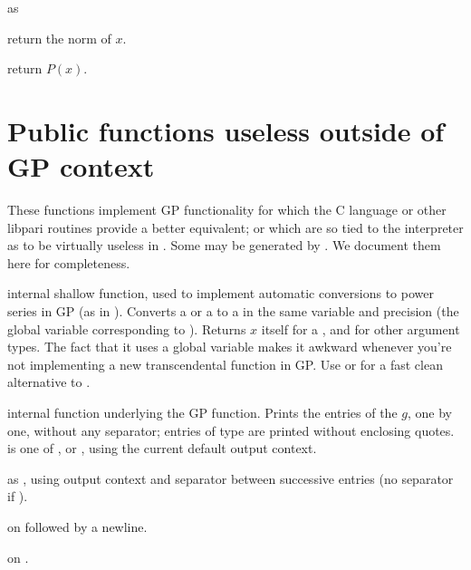 as 

 return the
norm of $x$.

return $P(x)$.

\section{Public functions useless outside of GP context}

These functions implement GP functionality for which the C language or
other libpari routines provide a better equivalent; or which are so tied
to the  interpreter as to be virtually useless in . Some
may be generated by . We document them here for completeness.


 internal shallow function, used to implement
automatic conversions to power series in GP (as in ).
Converts a  or a  to a  in the same variable and
precision  (the global variable corresponding to
). Returns $x$ itself for a , and 
for other argument types. The fact that it uses a global variable makes it
awkward whenever you're not implementing a new transcendental function in GP.
Use  or  for a fast clean alternative to
.


 internal function underlying the
 GP function. Prints the entries of the  $g$, one by one,
without any separator; entries of type  are printed without enclosing
quotes. \fl is one of ,  or , using the
current default output context.

 as
, using output context  and separator  between
successive entries (no separator if ).

  on
 followed by a newline.

  on
.

